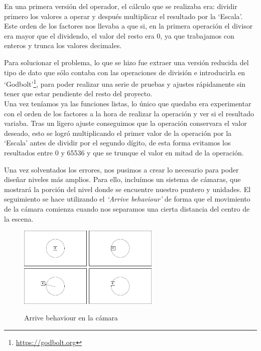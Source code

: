En una primera versión del operador, el cálculo que se realizaba era: dividir primero los valores a operar
y después multiplicar el resultado por la `Escala'. Este orden de los factores nos llevaba a que si, en la
primera operación el divisor era mayor que el dividendo, el valor del resto era 0, ya que trabajamos
con enteros y trunca los valores decimales.

Para solucionar el problema, lo que se hizo fue extraer una versión reducida del tipo de dato que sólo contaba
con las operaciones de división e introducirla en `Godbolt'\footnote{\url{https://godbolt.org}}, para poder
realizar una serie de pruebas y ajustes rápidamente sin tener que estar pendiente del resto del proyecto. \\
Una vez teníamos ya las funciones listas, lo único que quedaba era experimentar con el orden de los
factores a la hora de realizar la operación y ver si el resultado variaba. Tras un ligero ajuste conseguimos
que la operación conservara el valor deseado, esto se logró multiplicando el primer valor de la operación
por la `Escala' antes de dividir por el segundo dígito, de esta forma evitamos los resultados entre 0 y 65536
y que se trunque el valor en mitad de la operación.

Una vez solventados los errores, nos pusimos a crear lo necesario para poder diseñar niveles más amplios.
Para ello, incluímos un sistema de cámaras, que mostrará la porción del nivel donde se encuentre
nuestro puntero y unidades. El seguimiento se hace utilizando el \textit{`Arrive behaviour'} de forma que
el movimiento de la cámara comienza cuando nos separamos una cierta distancia del centro de la escena.

\begin{figure}[ht]
\centering
\includegraphics[width=0.6\textwidth]{imagenes/diario_desarrollo/camara.png}\\
\caption{Arrive behaviour en la cámara}
\label{fig:arrive_cam}
\end{figure}

